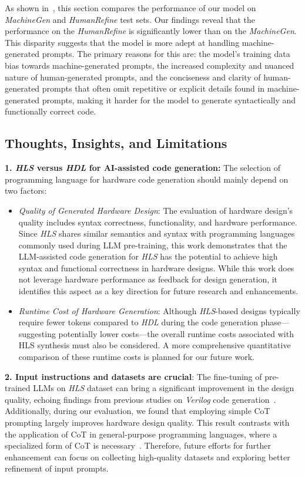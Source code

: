 As shown in~, this section compares the performance of our model on \textit{MachineGen} and \textit{HumanRefine} test sets.
Our findings reveal that the performance on the \textit{HumanRefine} is significantly lower than on the \textit{MachineGen}. This disparity suggests that the model is more adept at handling machine-generated prompts. The primary reasons for this are: the model's training data bias towards machine-generated prompts, the increased complexity and nuanced nature of human-generated prompts, and the conciseness and clarity of human-generated prompts that often omit repetitive or explicit details found in machine-generated prompts, making it harder for the model to generate syntactically and functionally correct code.

\subsection{Thoughts, Insights, and Limitations}

\noindent \textbf{1. \textit{HLS} versus \textit{HDL} for AI-assisted code generation:} The selection of programming language for hardware code generation should mainly depend on two  factors:
\begin{itemize}[leftmargin=*]
    \item \textit{Quality of Generated Hardware Design}: The evaluation of hardware design's quality includes syntax correctness, functionality, and hardware performance.
    Since \textit{HLS} shares similar semantics and syntax with programming languages commonly used during LLM pre-training, this work demonstrates that the LLM-assisted code generation for \textit{HLS} has the potential to achieve high syntax and functional correctness in hardware designs. While this work does not leverage hardware performance as feedback for design generation, it identifies this aspect as a key direction for future research and enhancements.
    \item \textit{Runtime Cost of Hardware Generation}: Although \textit{HLS}-based designs typically require fewer tokens compared to \textit{HDL} during the code generation phase—suggesting potentially lower costs—the overall runtime costs associated with HLS synthesis must also be considered. A more comprehensive quantitative comparison of these runtime costs is planned for our future work. 
\end{itemize}

\noindent \textbf{2. Input instructions and datasets are crucial}: The fine-tuning of pre-trained LLMs on \textit{HLS} dataset can bring a significant improvement in the design quality, echoing findings from previous studies on \textit{Verilog} code generation~\cite{thakur2023verigen}. 
Additionally, during our evaluation, we found that employing simple CoT prompting largely improves hardware design quality. 
This result contrasts with the application of CoT in general-purpose programming languages, where a specialized form of CoT is necessary~\cite{li2023structured}.
Therefore, future efforts for further enhancement can focus on collecting high-quality datasets and exploring better refinement of input prompts.

